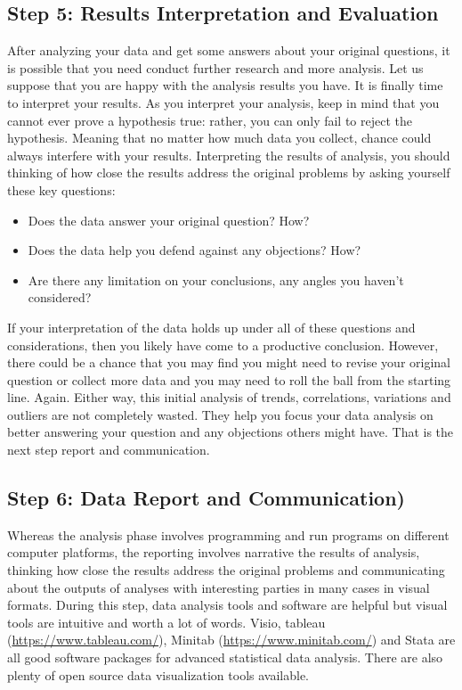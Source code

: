 \documentclass[
]{book}
\providecommand{\tightlist}{%
  \setlength{\itemsep}{0pt}\setlength{\parskip}{0pt}}
\begin{document}
\hypertarget{step-5-results-interpretation-and-evaluation}{%
\subsection*{Step 5: Results Interpretation and Evaluation}\label{step-5-results-interpretation-and-evaluation}}


After analyzing your data and get some answers about your original questions, it is possible that you need conduct further research and more analysis. Let us suppose that you are happy with the analysis results you have. It is finally time to interpret your results. As you interpret your analysis, keep in mind that you cannot ever prove a hypothesis true: rather, you can only fail to reject the hypothesis. Meaning that no matter how much data you collect, chance could always interfere with your results. Interpreting the results of analysis, you should thinking of how close the results address the original problems by asking yourself these key questions:

\begin{itemize}
\tightlist
\item
  Does the data answer your original question? How?
\item
  Does the data help you defend against any objections? How?
\item
  Are there any limitation on your conclusions, any angles you haven't considered?
\end{itemize}

If your interpretation of the data holds up under all of these questions and considerations, then you likely have come to a productive conclusion. However, there could be a chance that you may find you might need to revise your original question or collect more data and you may need to roll the ball from the starting line. Again. Either way, this initial analysis of trends, correlations, variations and outliers are not completely wasted. They help you focus your data analysis on better answering your question and any objections others might have. That is the next step report and communication.

\hypertarget{step-6-data-report-and-communication}{%
\subsection*{Step 6: Data Report and Communication)}\label{step-6-data-report-and-communication}}


Whereas the analysis phase involves programming and run programs on different computer platforms, the reporting involves narrative the results of analysis, thinking how close the results address the original problems and communicating about the outputs of analyses with interesting parties in many cases in visual formats.
During this step, data analysis tools and software are helpful but visual tools are intuitive and worth a lot of words. Visio, tableau (\url{https://www.tableau.com/}), Minitab (\url{https://www.minitab.com/}) and Stata are all good software packages for advanced statistical data analysis. There are also plenty of open source data visualization tools available.
\end{document}
